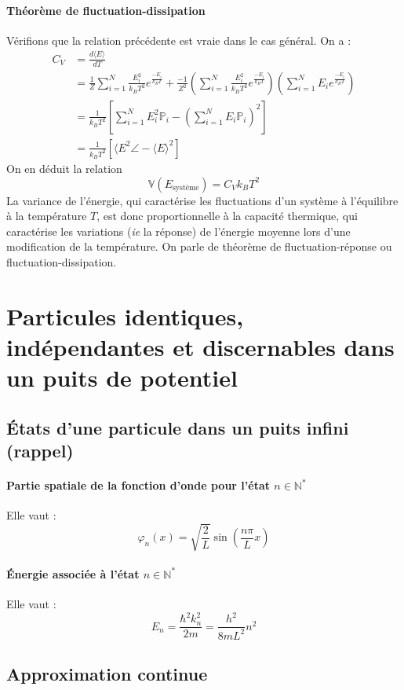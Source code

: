 \documentclass[french]{book}
\theoremstyle{plain}
\theoremstyle{definition}
\theoremstyle{remark}
\renewcommand{\P}{\mathbb{P}}
\newcommand{\N}{\mathbb{N}}
\newcommand{\st}{^*}
\begin{document}
\paragraph{Théorème de fluctuation-dissipation}Vérifions que la relation précédente est vraie dans le cas général. On a : \begin{align*}
	C_V&=\frac{d\langle E\rangle}{dT} \\
	&= \frac{1}{Z}\sum_{i=1}^{N}\frac{E_i^2}{k_BT^2}e^\frac{-E_i}{k_BT}+\frac{-1}{Z^2}\left(\sum_{i=1}^{N}\frac{E_i^2}{k_BT^2}e^\frac{-E_i}{k_BT}\right)\left(\sum_{i=1}^{N}E_ie^\frac{-E_i}{k_BT}\right) \\
	&= \frac{1}{k_BT^2}\left[\sum_{i=1}^{N}E_i^2\P_i-\left(\sum_{i=1}^{N}E_i\P_i\right)^2\right] \\
	&=\frac{1}{k_BT^2}\left[\langle E^2\angle-\langle E\rangle^2\right]
\end{align*} On en déduit la relation $$\mathbb{V}(E_\text{système})=C_Vk_BT^2$$ La variance de l'énergie, qui caractérise les fluctuations d'un système à l'équilibre à la température $T$, est donc proportionnelle à la capacité thermique, qui caractérise les variations (\textit{ie} la réponse) de l'énergie moyenne lors d'une modification de la température. On parle de théorème de fluctuation-réponse ou fluctuation-dissipation.

\section{Particules identiques, indépendantes et discernables dans un puits de potentiel}
\subsection{États d'une particule dans un puits infini (rappel)}
\paragraph{Partie spatiale de la fonction d'onde pour l'état $n\in\N\st$} Elle vaut : $$\varphi_n(x)=\sqrt{\frac{2}{L}}\sin\left(\frac{n\pi}{L}x\right)$$

\paragraph{Énergie associée à l'état $n\in\N\st$} Elle vaut : $$E_n=\frac{\hbar^2k_n^2}{2m}=\frac{h^2}{8mL^2}n^2$$

\subsection{Approximation continue}
\end{document}

